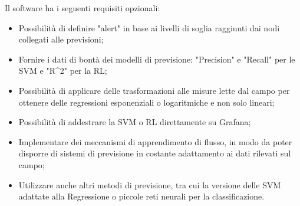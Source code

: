 \documentclass[../analisi-dei-requisiti.tex]{subfiles}
\begin{document}
	Il software ha i seguenti requisiti opzionali: 
	\begin{itemize}
		\item{Possibilità di definire "alert" in base ai livelli di soglia raggiunti dai nodi collegati alle previsioni;}
		\item{Fornire i dati di bontà dei modelli di previsione: "Precision" e "Recall" per le SVM e "R\^{}2" per la RL;}
		\item{Possibilità di applicare delle trasformazioni alle misure lette dal campo per ottenere delle regressioni esponenziali o logaritmiche e non solo lineari;}
		\item{Possibilità di addestrare la SVM o RL direttamente su Grafana;}
		\item{Implementare dei meccanismi di apprendimento di flusso, in modo da poter disporre di sistemi di previsione in costante adattamento ai dati rilevati sul campo;}
		\item{Utilizzare anche altri metodi di previsione, tra cui la versione delle SVM adattate alla Regressione o piccole reti neurali per la classificazione.}
	\end{itemize}
\end{document}
